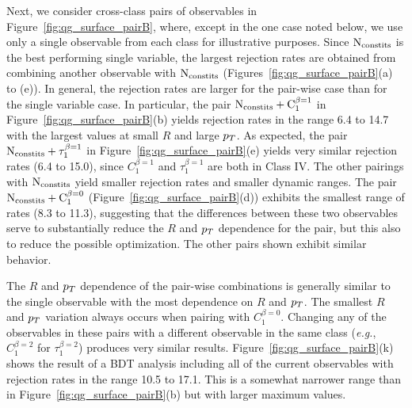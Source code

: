 Next, we consider  cross-class pairs of observables  in Figure~\ref{fig:qg_surface_pairB}, where, except in the one case noted below,
we use only a single observable from each class for illustrative purposes.
Since $\rm N_{constits}$ is the best performing single variable, the largest rejection
rates are obtained from combining another observable with $\rm{N_ {constits}}$ (Figures~\ref{fig:qg_surface_pairB}(a) to (e)).  
In general, the rejection rates are larger for the pair-wise case
than for the single variable case.  In particular, the pair $\rm{N_ {constits}}+ C_1^{\beta=1}$ in Figure~\ref{fig:qg_surface_pairB}(b)
yields rejection rates in the range 6.4 to 14.7 with the largest
values at small $R$ and large $p_T$.  As expected, the pair  $\rm{N_ {constits}}+ \tau_1^{\beta=1}$ in Figure~\ref{fig:qg_surface_pairB}(e)
yields very similar rejection rates (6.4 to 15.0), since $C_1^{\beta=1}$ and $\tau_1^{\beta=1}$ are both in Class IV. 
The other pairings with $\rm{N_ {constits}}$ yield smaller 
rejection rates and smaller dynamic ranges.  The pair $\rm{N_ {constits}}+ C_1^{\beta=0}$ (Figure~\ref{fig:qg_surface_pairB}(d)) exhibits
the smallest range of rates (8.3 to 11.3), suggesting that the differences between these two observables serve to substantially 
reduce the $R$ and $p_T$ dependence for the pair, but this also to reduce the possible optimization.  The other pairs shown exhibit
similar behavior.  

The $R$ and $p_T$ dependence of the pair-wise combinations is generally similar to the single observable with the most dependence 
on $R$ and $p_T$.  The smallest $R$ and $p_T$ variation always occurs 
when pairing with $C_1^{\beta=0}$.  Changing any of the observables in these pairs with a different observable in the same class (\textit{e.g.},
$C_1^{\beta=2}$ for $\tau_1^{\beta=2}$) produces very similar results.  Figure~\ref{fig:qg_surface_pairB}(k) shows the
result of a BDT analysis including all of the current observables with rejection rates in the range 10.5 to 17.1.  This is a somewhat narrower range
than in Figure~\ref{fig:qg_surface_pairB}(b) but with  larger maximum values.

